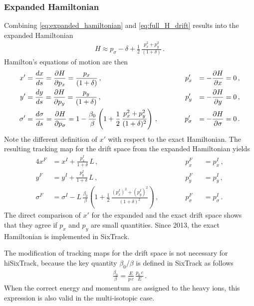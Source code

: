 \subsubsection{Expanded Hamiltonian}
Combining \eqref{eq:expanded_hamiltonian} and \eqref{eq:full_H_drift} results into the expanded Hamiltonian
\begin{align}
H \approx p_\sigma - \delta + \frac{1}{2} \, \frac{p_x^2+p_y^2}{(1+\delta)} \, . \label{eq:exp_drift}
\end{align}
Hamilton's equations of motion are then
\begin{alignat}{4}
x' &= \frac{d x}{d s} = \frac{\partial H}{\partial p_x} = \frac{p_x}{ (1+\delta) } \, , &p_x' &&= -\frac{\partial H}{\partial x} = 0 \, , \\
y' &= \frac{d y}{d s} = \frac{\partial H}{\partial p_y} = \frac{p_y}{ (1+\delta) }\, , \quad \quad &p_y' &&= -\frac{\partial H}{\partial y} = 0 \, , \\
\sigma' &=  \frac{d \sigma}{d s} = \frac{\partial H}{\partial p_\sigma} =  1 - \frac{\beta_0}{\beta} \left( 1 + \frac{1}{2} \, \frac{p_x^2 + p_y^2}{(1+\delta)^2}  \right)\, ,   \quad \quad \quad  &p_\sigma' &&= -\frac{\partial H}{\partial \sigma} = 0 \, .
\end{alignat}
Note the different definition of $x'$ with respect to the exact Hamiltonian. The resulting tracking map for the drift space from the expanded Hamiltonian yields
%
\begin{alignat}{4}
x^F &= x^I +   \frac{p_x^I}{1+\delta} \, L \, , &p_x^F &&= p_x^I \, , \\
y^F &= y^I +   \frac{p_y^I}{1+\delta} \, L \, , &p_y^F &&= p_y^I \, , \\
\sigma^F &=  \sigma^I - L \, \frac{\beta_0}{\beta} \left( 1 + \frac{1}{2} \, \frac{(p_x^I)^2 + (p_y^I)^2}{(1+\delta)^2}  \right) \, ,  \quad \quad \quad  &p_\sigma^F &&=  p_\sigma^I \, .
\end{alignat}
%
The direct comparison of $x'$ for the expanded and the exact drift space shows that they agree if $p_x$ and $p_y$ are small quantities. Since 2013, the exact Hamiltonian is implemented in SixTrack.

The modification of tracking maps for the drift space is not necessary for hiSixTrack, because the key quantity $\beta_0/\beta$ is defined in SixTrack as follows
\begin{align}
\frac{\beta_0}{\beta} = \frac{E}{p \, c} \, \frac{p_0 \, c}{E} \, .
\end{align}
When the correct energy and momentum are assigned to the heavy ions, this expression is also valid in the multi-isotopic case.

